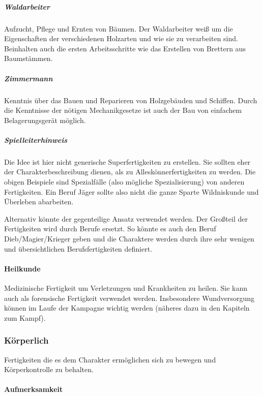 \documentclass{article}
\begin{document}
\subparagraph{Waldarbeiter}

Aufzucht, Pflege und Ernten von Bäumen. Der Waldarbeiter weiß um die Eigenschaften der verschiedenen Holzarten und
wie sie zu verarbeiten sind. Beinhalten auch die ersten Arbeitsschritte wie das Erstellen von Brettern aus
Baumstämmen.

\subparagraph{Zimmermann}

Kenntnis über das Bauen und Reparieren von Holzgebäuden und Schiffen. Durch die Kenntnisse der nötigen
Mechanikgesetze ist auch der Bau von einfachem Belagerungsgerät möglich.

\begin{mdframed}[hidealllines=true, backgroundcolor=black!10]
\subparagraph{Spielleiterhinweis}

Die Idee ist hier nicht generische Superfertigkeiten zu erstellen. Sie sollten eher der Charakterbeschreibung dienen,
als zu Alleskönnerfertigkeiten zu werden. Die obigen Beispiele sind Spezialfälle (also mögliche Spezialisierung) von
anderen Fertigkeiten. Ein Beruf Jäger sollte also nicht die ganze Sparte Wildniskunde und Überleben abarbeiten.

Alternativ könnte der gegenteilige Ansatz verwendet werden. Der Großteil der Fertigkeiten wird durch Berufe ersetzt.
So könnte es auch den Beruf Dieb/Magier/Krieger geben und die Charaktere werden durch ihre sehr wenigen und
übersichtlichen Berufsfertigkeiten definiert.

\end{mdframed}
\paragraph{Heilkunde}

Medizinische Fertigkeit um Verletzungen und Krankheiten zu heilen. Sie kann auch als forensische Fertigkeit
verwendet werden. Insbesondere Wundversorgung können im Laufe der Kampagne wichtig werden (näheres dazu in den
Kapiteln zum Kampf).

\subsubsection{Körperlich}

Fertigkeiten die es dem Charakter ermöglichen sich zu bewegen und Körperkontrolle zu behalten.

\paragraph{Aufmerksamkeit}
\end{document}
